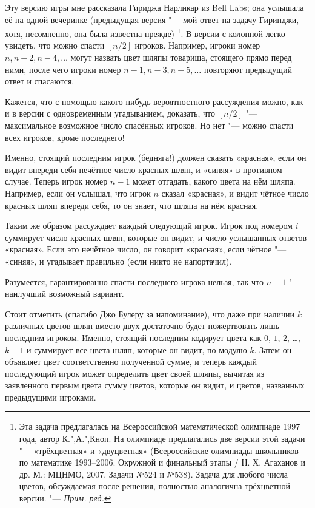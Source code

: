 \documentclass[twoside]{book}
\newcommand\Vseros{Всероссийские олимпиады школьников по математике 1993--2006. Окружной и финальный этапы / Н. Х. Агаханов и др.  М.: МЦНМО, 2007}
\begin{document}
Эту версию игры мне рассказала Гириджа Нарликар из Bell Labs; %
она услышала её на одной вечеринке (предыдущая версия "--- мой ответ на задачу Гиринджи, хотя, несомненно, она была известна прежде)%
\footnote{Эта задача предлагалась на Всероссийской математической олимпиаде 1997 года, автор К.",А.",Кноп.  На олимпиаде предлагались две версии этой задачи "--- «трёхцветная» и «двуцветная» (\Vseros. Задачи №524 и №538). 
Задача для любого числа цветов, обсуждаемая после решения, полностью аналогична трёхцветной версии. "--- \emph{Прим. ред.}}.
В версии с колонной легко увидеть, что можно спасти $[n/2]$ игроков.
Например, игроки номер $n, n-2, n-4,\dots$
могут назвать цвет шляпы товарища, стоящего прямо перед ними, после
чего игроки номер $n-1, n-3,n-5,\dots$
повторяют предыдущий ответ и спасаются.

\medskip

Кажется, что с помощью какого-нибудь вероятностного рассуждения можно,
как и в версии с одновременным угадыванием, доказать, что $[n/2]$ "--- максимальное возможное число спасённых игроков.
Но нет "--- можно спасти всех игроков, кроме последнего!

Именно, стоящий последним игрок (бедняга!) должен сказать
«красная», если он видит впереди себя нечётное число красных шляп, и «синяя» в противном случае.
Теперь игрок номер $n-1$ может отгадать, какого цвета на нём шляпа.
Например, если он услышал, что игрок $n$ сказал
«красная», и видит чётное число красных шляп впереди себя, то он
знает, что шляпа на нём красная.

Таким же образом рассуждает каждый следующий игрок.
Игрок под номером
$i$ суммирует число красных шляп, которые он видит, и число услышанных
ответов «красная».
Если это нечётное число, он говорит «красная»,
если чётное "--- «синяя», и угадывает правильно (если никто не
напортачил).

Разумеется, гарантированно спасти последнего игрока нельзя, так что $n-1$ "--- наилучший возможный вариант.
\heart

\medskip

Стоит отметить (спасибо Джо Булеру %
за напоминание), что даже при наличии $k$ различных цветов шляп вместо
двух достаточно будет пожертвовать лишь последним игроком.
Именно, стоящий последним кодирует цвета как $0$, $1$, $2$, \dots, $k-1$ и суммирует все цвета шляп, которые он видит, по модулю $k$.
Затем он объявляет цвет соответственно полученной сумме, и теперь каждый последующий игрок может определить цвет своей шляпы, вычитая из заявленного первым цвета сумму цветов, которые он видит, и цветов, названных предыдущими игроками.
\end{document}
